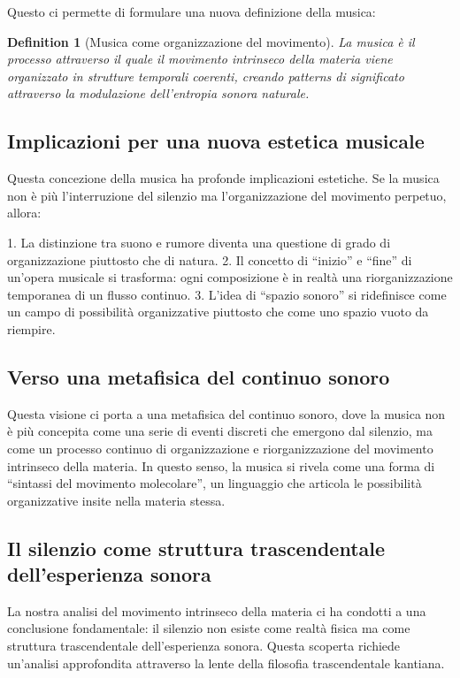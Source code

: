 \documentclass[a4paper,11pt]{article}
\begin{document}
Questo ci permette di formulare una nuova definizione della musica:

\textbf{Definition 1} (Musica come organizzazione del movimento).
\emph{La musica è il processo attraverso il quale il movimento
intrinseco della materia viene organizzato in strutture temporali
coerenti, creando patterns di significato attraverso la modulazione
dell'entropia sonora naturale.}

\subsection{Implicazioni per una nuova estetica
musicale}\label{implicazioni-per-una-nuova-estetica-musicale}

Questa concezione della musica ha profonde implicazioni estetiche. Se la
musica non è più l'interruzione del silenzio ma l'organizzazione del
movimento perpetuo, allora:

1. La distinzione tra suono e rumore diventa una questione di grado di
organizzazione piuttosto che di natura. 2. Il concetto di ``inizio'' e
``fine'' di un'opera musicale si trasforma: ogni composizione è in
realtà una riorganizzazione temporanea di un flusso continuo. 3. L'idea
di ``spazio sonoro'' si ridefinisce come un campo di possibilità
organizzative piuttosto che come uno spazio vuoto da riempire.

\subsection{Verso una metafisica del continuo
sonoro}\label{verso-una-metafisica-del-continuo-sonoro}

Questa visione ci porta a una metafisica del continuo sonoro, dove la
musica non è più concepita come una serie di eventi discreti che
emergono dal silenzio, ma come un processo continuo di organizzazione e
riorganizzazione del movimento intrinseco della materia. In questo
senso, la musica si rivela come una forma di ``sintassi del movimento
molecolare'', un linguaggio che articola le possibilità organizzative
insite nella materia stessa.

\subsection{Il silenzio come struttura trascendentale dell'esperienza
sonora}\label{il-silenzio-come-struttura-trascendentale-dellesperienza-sonora}

La nostra analisi del movimento intrinseco della materia ci ha condotti
a una conclusione fondamentale: il silenzio non esiste come realtà
fisica ma come struttura trascendentale dell'esperienza sonora. Questa
scoperta richiede un'analisi approfondita attraverso la lente della
filosofia trascendentale kantiana.
\end{document}
